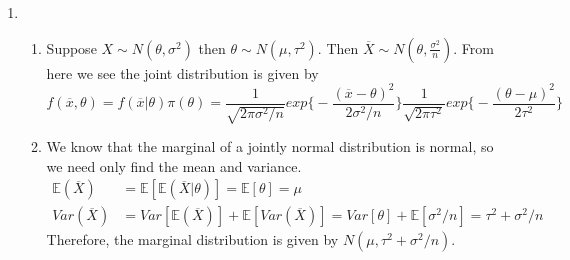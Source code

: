 \documentclass[12pt]{article}  %
\newcommand{\E}{{\mathbb{E}}}
\begin{document}
\begin{enumerate}
\item 
	\begin{enumerate}
		\item Suppose $X\sim N(\theta,\sigma^2)$ then $\theta \sim N(\mu, \tau^2)$. Then $\overline{X}\sim N(\theta,\frac{\sigma^2}{n})$. From here we see the joint distribution is given by $$f(\overline{x},\theta) = f(\overline{x}|\theta)\pi(\theta) = \frac{1}{\sqrt{2\pi\sigma^2/n}}exp\Big\{-\frac{(\overline{x}-\theta)^2}{2\sigma^2/n}\Big\}\frac{1}{\sqrt{2\pi\tau^2}}exp\Big\{-\frac{(\theta-\mu)^2}{2\tau^2}\Big\}$$

		\item We know that the marginal of a jointly normal distribution is normal, so we need only find the mean and variance.
		\begin{align*}
		\E(\overline{X}) &= \E[\E(\overline{X}|\theta)] = \E[\theta] = \mu\\
		Var(\overline{X}) &= Var[\E(\overline{X})] + \E[Var(\overline{X})] = Var[\theta] + \E[\sigma^2/n] = \tau^2 + \sigma^2/n
		\end{align*}
		Therefore, the marginal distribution is given by $N(\mu, \tau^2 + \sigma^2/n)$. 


\end{enumerate}
\end{enumerate}
\end{document}
